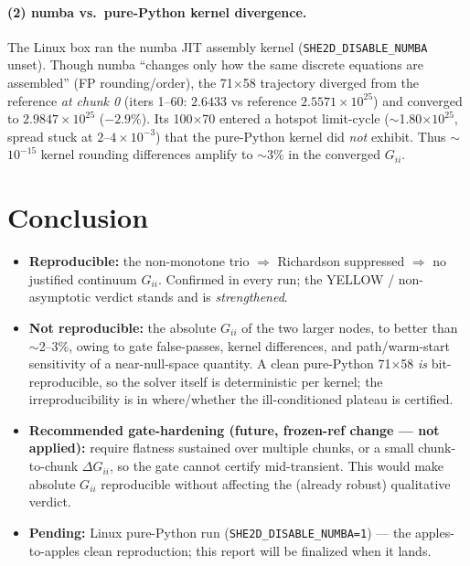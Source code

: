 \documentclass[11pt]{article}
\newcommand{\ten}[1]{\times 10^{#1}}
\begin{document}
\paragraph{(2) numba vs.\ pure-Python kernel divergence.} The Linux box ran the numba JIT assembly kernel (\texttt{SHE2D\_DISABLE\_NUMBA} unset). Though numba ``changes only how the same discrete equations are assembled'' (FP rounding/order), the 71$\times$58 trajectory diverged from the reference \emph{at chunk 0} (iters 1--60: $2.6433$ vs reference $2.5571\ten{25}$) and converged to $2.9847\ten{25}$ ($-2.9\%$). Its 100$\times$70 entered a hotspot limit-cycle ($\sim$1.80$\ten{25}$, spread stuck at $2$--$4\ten{-3}$) that the pure-Python kernel did \emph{not} exhibit. Thus $\sim$$10^{-15}$ kernel rounding differences amplify to $\sim$3\% in the converged $G_{ii}$.

\section*{Conclusion}
\begin{itemize}[nosep]
\item \textbf{Reproducible:} the non-monotone trio $\Rightarrow$ Richardson suppressed $\Rightarrow$ no justified continuum $G_{ii}$. Confirmed in every run; the YELLOW / non-asymptotic verdict stands and is \emph{strengthened}.
\item \textbf{Not reproducible:} the absolute $G_{ii}$ of the two larger nodes, to better than $\sim$2--3\%, owing to gate false-passes, kernel differences, and path/warm-start sensitivity of a near-null-space quantity. A clean pure-Python 71$\times$58 \emph{is} bit-reproducible, so the solver itself is deterministic per kernel; the irreproducibility is in where/whether the ill-conditioned plateau is certified.
\item \textbf{Recommended gate-hardening (future, frozen-ref change --- not applied):} require flatness sustained over multiple chunks, or a small chunk-to-chunk $\Delta G_{ii}$, so the gate cannot certify mid-transient. This would make absolute $G_{ii}$ reproducible without affecting the (already robust) qualitative verdict.
\item \textbf{Pending:} Linux pure-Python run (\texttt{SHE2D\_DISABLE\_NUMBA=1}) --- the apples-to-apples clean reproduction; this report will be finalized when it lands.
\end{itemize}
\end{document}
